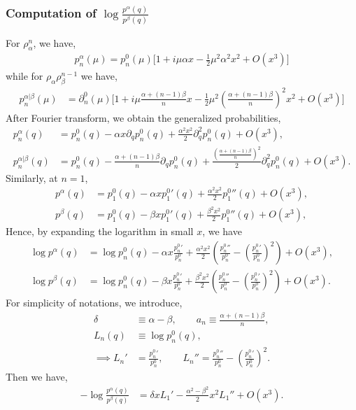 \documentclass[11pt]{article}
\newcommand{\p}{\partial}
\newcommand{\lb}{\left(}
\newcommand{\rb}{\right)}
\begin{document}
\subsubsection{\texorpdfstring{Computation of $\log \frac{p^\alpha(q)}{p^\beta(q)}$}{ log p alpha / p beta}}
For $\rho_\alpha^n$, we have,
\begin{align}
    p_n^\alpha(\mu) = p_n^0(\mu) \Big[ 1+ i\mu \alpha x - \frac{1}{2}\mu^2 \alpha^2 x^2 + O(x^3)\Big]
\end{align}
while for $\rho_\alpha\rho_\beta^{n-1}$ we have,
\begin{align}
    p_n^{\alpha|\beta}(\mu) &= \p_n^0(\mu) \Big[ 1+ i\mu \frac{\alpha + (n-1)\beta}{n}x - \frac{1}{2}\mu^2\lb\frac{\alpha + (n-1)\beta}{n}\rb^2x^2 + O(x^3)\Big]
\end{align}
After Fourier transform, we obtain the generalized probabilities,
\begin{align}
    p_n^\alpha(q) &= p_n^0(q) - \alpha x\p_qp_n^0(q)+ \frac{\alpha^2 x^2}{2}\p_q^2p_n^0(q) + O(x^3), \\
    p_n^{\alpha|\beta}(q) &= p_n^0(q) - \frac{\alpha + (n-1)\beta}{n}\p_qp_n^0(q) + \frac{\lb\frac{\alpha + (n-1)\beta}{n}\rb^2}{2} \p_q^2p_n^0(q) + O(x^3).
\end{align}
Similarly, at $n=1$, 
\begin{align}
    p^\alpha(q) &= p_1^0(q) - \alpha x p_1^0{'}(q)+ \frac{\alpha^2 x^2}{2}p_1^0{''}(q) + O(x^3),
    \\
    p^\beta(q) &= p_1^0(q) - \beta x p_1^0{'}(q)+ \frac{\beta^2 x^2}{2}p_1^0{''}(q) + O(x^3),
\end{align}
Hence, by expanding the logarithm in small $x$, we have
\begin{align}
    \log p^\alpha(q) &= \log p_n^0(q) - \alpha x \frac{p_n^0{'}}{p_n^0} + \frac{\alpha^2x^2}{2}\lb\frac{p_n^0{''}}{p_n^0} - \lb\frac{p_n^0{'}}{p_n^0}\rb^2 \rb + O(x^3),\\
    \log p^\beta(q) &= \log p_n^0(q) - \beta x \frac{p_n^0{'}}{p_n^0} + \frac{\beta^2x^2}{2}\lb\frac{p_n^0{''}}{p_n^0} - \lb\frac{p_n^0{'}}{p_n^0}\rb^2 \rb + O(x^3).
\end{align}
For simplicity of notations, we introduce,
\begin{align}
    \delta &\equiv \alpha - \beta,\qquad a_n \equiv \frac{\alpha + (n-1)\beta}{n},  \\ L_n(q) &\equiv \log p_n^0(q),
    \\
    \implies L_n'&= \frac{p_n^0{'}}{p_n^0} , \qquad L_n'' = \frac{p_n^0{''}}{p_n^0} - \lb\frac{p_n^0{'}}{p_n^0}\rb^2 .
\end{align}
Then we have,
\begin{align}
    -\log \frac{p^\alpha(q)}{p^\beta(q)} &= \delta x L_1' - \frac{\alpha^2-\beta^2}{2}x^2L_1'' + O(x^3).
\end{align}
\end{document}
